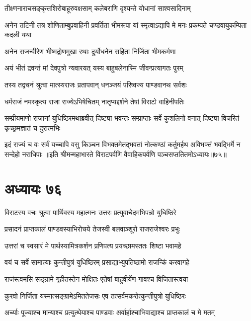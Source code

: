 \twolineshloka
{तीक्ष्णनाराचसङ्कृत्तशिरोबाहूरुवक्षसाम्}
{कलेबराणि दृश्यन्ते योधानां साश्वसादिनाम्}


\threelineshloka
{अनेन तटिनी तत्र शोणिताम्बुप्रवाहिनी}
{प्रवर्तिता भीमरूपा यां स्मृत्वाऽद्यापि मे मनः}
{प्रकम्पते चण्डवायुकम्पिता कदली यथा}


\twolineshloka
{अनेन राजन्वीरेण भीष्मद्रोणमुखा रथाः}
{दुर्योधनेन सहिता निर्जिता भीमकर्मणा}


\twolineshloka
{अयं भीतं द्रवन्तं मां देवपुत्रो न्यवारयत्}
{यस्य बाहुबलेनास्मि जीवन्प्रत्यागतः पुरम्}



\twolineshloka
{तस्य तद्वचनं श्रुत्वा मात्स्यराजः प्रतापवान्}
{धनञ्जयं परिष्वज्य पाण्डवानथ सर्वशः}


\twolineshloka
{धर्मराजं नमस्कृत्य राजा राज्येऽभिषेचितम्}
{नातृप्यद्दर्शने तेषां विराटो वाहिनीपतिः}


\threelineshloka
{सम्प्रीयमाणो राजानां युधिष्ठिरमथाब्रवीत्}
{दिष्ट्या भवन्तः सम्प्राप्ताः सर्वे कुशलिनो वनात्}
{दिष्ट्या विचरितं कृच्छ्रमज्ञातं च दुरात्मभिः}


\threelineshloka
{इदं राज्यं च वः सर्वं यच्चापि वसु किञ्चन}
{विभक्तमेतद्भवतां नोत्कण्ठां कर्तुमर्हथ}
{अविभक्तं भवद्भिर्मे न सन्देहो नराधिपाः}
॥इति श्रीमन्महाभारते विराटपर्वणि वैवाहिकपर्वणि पञ्चसप्ततितमोऽध्यायः॥७५॥

\chapter{अध्यायः ७६}

\twolineshloka
{विराटस्य वचः श्रुत्वा पार्थिवस्य महात्मनः}
{उत्तरः प्रत्युवाचेदमभिपन्नो युधिष्ठिरे}


\twolineshloka
{प्रसादनं प्राप्तकालं पाण्डवस्याभिरोचये}
{तेजस्वी बलवाञ्शूरो राजराजेश्वरः प्रभुः}


\twolineshloka
{उत्तरां च स्वसारं मे पार्थस्यामित्रकर्शन}
{प्रणिपत्य प्रयच्छामस्ततः शिष्टा भवामहे}



\twolineshloka
{वयं च सर्वे सामात्याः कुन्तीपुत्रं युधिष्ठिरम्}
{प्रसाद्याभ्युपतिष्ठामो राजन्किं करवागहे}


\twolineshloka
{राजंस्त्वमसि सङ्ग्रामे गृहीतस्तेन मोक्षितः}
{एतेषां बाहुवीर्येण गावश्च विजितास्त्वया}


\twolineshloka
{कुरवो निर्जिता यस्मात्सङ्ग्रामेऽमिततेजसः}
{एष तत्सर्वमकरोत्कुन्तीपुत्रो युधिष्ठिरः}


\twolineshloka
{अर्च्याः पूज्याश्च मान्याश्च प्रत्युत्थेयाश्च पाण्डवाः}
{अर्वार्हाश्चाभिवाद्याश्च प्राप्तकालं च मे मतम्}


